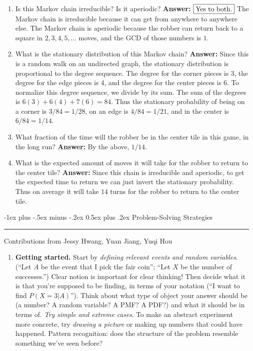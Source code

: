 \documentclass[10pt,landscape]{article}
\makeatletter
\renewcommand{\section}{\@startsection{section}{1}{0mm}%
                                {-1ex plus -.5ex minus -.2ex}%
                                {0.5ex plus .2ex}%
                                {\normalfont\large\bfseries}}
\makeatother
\begin{document}
\begin{multicols*}{3}
    \begin{enumerate}[label=(\alph*)]
        \item Is this Markov chain irreducible? Is it aperiodic? \textbf{Answer:} $\boxed{\textnormal{Yes to both.}}$ The Markov chain is irreducible because it can get from anywhere to anywhere else. The Markov chain is  aperiodic because the robber can return back to a square in $2, 3, 4, 5, \dots$ moves, and the GCD of those numbers is $1$.
        \item What is the stationary distribution of this Markov chain? \textbf{Answer:} Since this is a random walk on an undirected graph, the stationary distribution is proportional to the degree sequence. The degree for the corner pieces is 3, the degree for the edge pieces is 4, and the degree for the center pieces is 6. To normalize this degree sequence, we divide by its sum. The sum of the degrees is $6(3) + 6(4) + 7(6) = 84$. Thus the stationary probability of being on a corner is $3/84 = 1/28$, on an edge is $4/84 =  1/21$, and in the center is $6/84 = 1/14$.
        \item What fraction of the time will the robber be in the center tile in this game, in the long run? \textbf{Answer:} By the above, $\boxed{1/14}$.
        \item What is the expected amount of moves it will take for the robber to return to the center tile? \textbf{Answer:} Since this chain is irreducible and aperiodic, to get the expected time to return we can just invert the stationary probability. Thus on average it will take $\boxed{14}$ turns for the robber to return to the center tile.
    \end{enumerate}
                            
                            
    \section{Problem-Solving Strategies} \smallskip \hrule height 2pt \smallskip
    Contributions from Jessy Hwang, Yuan Jiang, Yuqi Hou
    \begin{enumerate}
        \item \textbf{Getting started.} Start by \emph{defining relevant events and random variables}. (``Let $A$ be the event that I pick the fair coin''; ``Let $X$ be the number of successes.'') Clear notion is important for clear thinking! Then decide what it is that you're supposed to be finding, in terms of your notation (``I want to find $P(X=3|A)$''). Think about what type of object your answer should be (a number? A random variable? A PMF? A PDF?) and what it should be in terms of.
        \emph{Try simple and extreme cases}. To make an abstract experiment more concrete, try \emph{drawing a picture} or making up numbers that could have happened. Pattern recognition: does the structure of the problem resemble something we've seen before?
        

\end{enumerate}
\end{multicols*}
\end{document}
